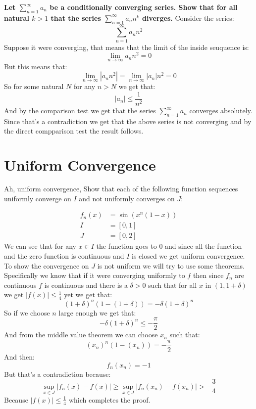 \documentclass[11pt,a4paper]{article}
\begin{document}
	\textbf{Let $\sum_{n=1}^{\infty}{a_n}$ be a conditionally converging
	series. Show that for all natural $k>1$ that the series 
	$\sum_{n=1}^{\infty}{a_{n}n^{k}}$ diverges.}
	Consider the series:
	\[
		\sum_{n=1}^{\infty}{a_{n}n^2}
	\]
	Suppose it were converging, that means that the limit of the inside
	seuquence is:
	\[
		\lim_{n\to\infty}{a_{n}n^2} = 0
	\]
	But this means that:
	\[
		\lim_{n\to\infty}{|a_{n}n^2|} = \lim_{n\to\infty}{|a_{n}|n^2} = 0
	\]
	So for some natural $N$ for any $n > N$ we get that:
	\[
		|a_n| \le \frac{1}{n^2}
	\]
	And by the comparison test we get that the series 
	$\sum_{n=1}^{\infty}{a_n}$ converges absolutely. Since that's
	a contradiction we get that the above series is not converging
	and by the direct compparison test the result follows.
	
	\newpage
	
	\section{Uniform Convergence}
	Ah, uniform convergence, 
	Show that each of the following function sequences uniformly converge on
	$I$ and not uniformly converges on $J$:
	
	\begin{align*}
		f_n(x) &= \sin(x^n(1-x)) \\
		I &= [0,1] \\
		J &= [0,2]
	\end{align*}
	We can see that for any $x\in I$ the function goes to $0$ and since
	all the function and the zero function is continuous and $I$ is closed
	we get uniform convergence. To show the convergence on $J$ is not
	uniform we will try to use some theorems. Specifically we know that
	if it were converging uniformly to $f$ then since $f_n$ are continuous
	$f$ is continuous and there is a $\delta > 0$ such that for all $x$ in
	$(1,1+\delta)$ we get $|f(x)| \le \frac 14$ yet we get that:
	\[
		(1+\delta)^n(1-(1+\delta)) = -\delta(1+\delta)^n
	\]
	So if we choose $n$ large enough we get that:
	\[
		-\delta(1+\delta)^n \le -\frac{\pi}{2}
	\]
	And from the middle value theorem we can choose $x_n$ such that:
	\[
		(x_n)^n(1-(x_n)) = -\frac{\pi}{2}
	\]
	And then:
	\[
		f_n(x_n) = -1
	\]
	But that's a contradiction because:
	\[
		\sup_{x\in J}|f_n(x) - f(x)| \geq 
		\sup_{x\in J}|f_n(x_n) - f(x_n)| > -\frac 34
	\]
	Because $|f(x)| \le \frac 14$ which completes the proof.
	
	\newpage
	
\end{document}
